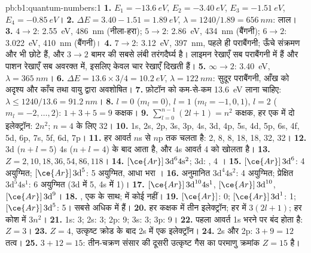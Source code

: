 \begin{solution}{pb:b1:quantum-numbers:1}
\textbf{1.} $E_1 = \qty{-13.6}{eV}$, $E_2 = \qty{-3.40}{eV}$,
$E_3 = \qty{-1.51}{eV}$, $E_4 = \qty{-0.85}{eV}$।
\textbf{2.} $\Delta E = 3.40 - 1.51 = \qty{1.89}{eV}$, $\lambda = 1240/1.89
= \qty{656}{nm}$: लाल।
\textbf{3.} $4 \to 2$: \qty{2.55}{eV}, \qty{486}{nm} (नीला-हरा);
$5 \to 2$: \qty{2.86}{eV}, \qty{434}{nm} (बैंगनी); $6 \to 2$: \qty{3.022}{eV},
\qty{410}{nm} (बैंगनी)।
\textbf{4.} $7 \to 2$: \qty{3.12}{eV}, \qty{397}{nm}, पहले ही पराबैंगनी;
ऊँचे संक्रमण और भी छोटे हैं, और $3 \to 2$ बामर की सबसे लंबी
तरंगदैर्घ्य है। लाइमन रेखाएँ सब पराबैंगनी में हैं और पाशन
रेखाएँ सब अवरक्त में, इसलिए केवल चार रेखाएँ दिखती हैं।
\textbf{5.} $\infty \to 2$: \qty{3.40}{eV}, $\lambda = \qty{365}{nm}$।
\textbf{6.} $\Delta E = 13.6 \times 3/4 = \qty{10.2}{eV}$, $\lambda =
\qty{122}{nm}$: सुदूर पराबैंगनी, आँख को अदृश्य और काँच तथा वायु द्वारा
अवशोषित।
\textbf{7.} फ़ोटॉन को कम-से-कम \qty{13.6}{eV} लाना चाहिए: $\lambda \le
1240/13.6 = \qty{91.2}{nm}$।
\textbf{8.} $l = 0$ ($m_l = 0$), $l = 1$ ($m_l = -1, 0, 1$), $l = 2$
($m_l = -2, \dots, 2$): $1 + 3 + 5 = 9$ कक्षक।
\textbf{9.} $\sum_{l=0}^{n-1}(2l+1) = n^2$ कक्षक, हर एक में दो इलेक्ट्रॉन:
$2n^2$; $n = 4$ के लिए 32।
\textbf{10.} 1s, 2s, 2p, 3s, 3p, 4s, 3d, 4p, 5s, 4d, 5p, 6s, 4f, 5d, 6p,
7s, 5f, 6d, 7p।
\textbf{11.} हर आवर्त $n$s से $n$p तक चलता है: 2, 8, 8, 18, 18, 32, 32।
\textbf{12.} 3d ($n + l = 5$) 4s ($n + l = 4$) के बाद आता है, और 4s
आवर्त 4 को खोलता है।
\textbf{13.} $Z = 2, 10, 18, 36, 54, 86, 118$।
\textbf{14.} $[\ce{Ar}]\,3\text{d}^6 4\text{s}^2$; 3d: ,
4 ।
\textbf{15.}  $[\ce{Ar}]\,3\text{d}^6$: 4 अयुग्मित;
 $[\ce{Ar}]\,3\text{d}^5$: 5 अयुग्मित, आधा भरा ।
\textbf{16.} अनुमानित $3\text{d}^4 4\text{s}^2$: 4 अयुग्मित; प्रेक्षित
$3\text{d}^5 4\text{s}^1$: 6 अयुग्मित (3d में 5, 4s में 1)।
\textbf{17.}  $[\ce{Ar}]\,3\text{d}^{10} 4\text{s}^1$, 
$[\ce{Ar}]\,3\text{d}^{10}$,  $[\ce{Ar}]\,3\text{d}^9$।
\textbf{18.} , एक  के साथ;  में कोई नहीं।
\textbf{19.}  $[\ce{Ar}]$: 0;  $[\ce{Ar}]\,3\text{d}^1$:
1;  $[\ce{Ar}]\,3\text{d}^5$: 5। सबसे अधिक  में हैं।
\textbf{20.} हर कक्षक में तीन इलेक्ट्रॉन; हर  में $3(2l + 1)$;
हर कोश में $3n^2$।
\textbf{21.} 1s: 3; 2s: 3; 2p: 9; 3s: 3; 3p: 9।
\textbf{22.} पहला आवर्त 1s भरने पर बंद होता है: $Z = 3$।
\textbf{23.} $Z = 4$, उत्कृष्ट क्रोड के बाद 2s में एक इलेक्ट्रॉन।
\textbf{24.} 2s और 2p: $3 + 9 = 12$ तत्व।
\textbf{25.} $3 + 12 = 15$: तीन-चक्रण संसार की दूसरी उत्कृष्ट गैस का
परमाणु क्रमांक \textbf{$Z = 15$} है।
\end{solution}
